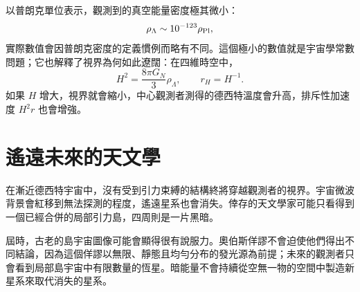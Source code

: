 以普朗克單位表示，觀測到的真空能量密度極其微小：
\begin{equation}
\rho_\Lambda\sim10^{-123}\rho_{\rm Pl},
\label{eq:l09-planck-smallness}
\end{equation}
實際數值會因普朗克密度的定義慣例而略有不同。這個極小的數值就是宇宙學常數問題；它也解釋了視界為何如此遼闊：在四維時空中，
\begin{equation}
H^2=\frac{8\pi G_N}{3}\rho_\Lambda,
\qquad
r_H=H^{-1}.
\end{equation}
如果 \(H\) 增大，視界就會縮小，中心觀測者測得的德西特溫度會升高，排斥性加速度 \(H^2r\) 也會增強。

\begin{classroomqa}
\end{classroomqa}

\begin{classroomqa}
\end{classroomqa}

\section{遙遠未來的天文學}

在漸近德西特宇宙中，沒有受到引力束縛的結構終將穿越觀測者的視界。宇宙微波背景會紅移到無法探測的程度，遙遠星系也會消失。倖存的天文學家可能只看得到一個已經合併的局部引力島，四周則是一片黑暗。

\begin{classroomqa}
\end{classroomqa}

屆時，古老的島宇宙圖像可能會顯得很有說服力。奧伯斯佯謬不會迫使他們得出不同結論，因為這個佯謬以無限、靜態且均勻分布的發光源為前提；未來的觀測者只會看到局部島宇宙中有限數量的恆星。暗能量不會持續從空無一物的空間中製造新星系來取代消失的星系。

